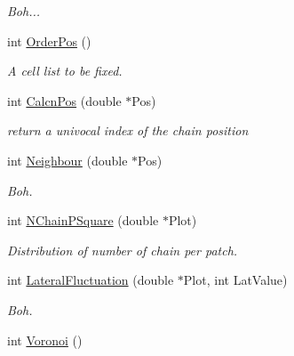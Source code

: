 \begin{DoxyCompactItemize}
\begin{DoxyCompactList}\small\item\em Boh... \end{DoxyCompactList}\item 
int \hyperlink{classVarData_a082d12c71897bca838b5eaad6deb3fae}{Order\+Pos} ()\hypertarget{classVarData_a082d12c71897bca838b5eaad6deb3fae}{}\label{classVarData_a082d12c71897bca838b5eaad6deb3fae}

\begin{DoxyCompactList}\small\item\em A cell list to be fixed. \end{DoxyCompactList}\item 
int \hyperlink{classVarData_a129e31bb544b71263ac43dda442b63c4}{Calcn\+Pos} (double $\ast$Pos)\hypertarget{classVarData_a129e31bb544b71263ac43dda442b63c4}{}\label{classVarData_a129e31bb544b71263ac43dda442b63c4}

\begin{DoxyCompactList}\small\item\em return a univocal index of the chain position \end{DoxyCompactList}\item 
int \hyperlink{classVarData_a933801832476dc21fcb11bf694c5d5d1}{Neighbour} (double $\ast$Pos)\hypertarget{classVarData_a933801832476dc21fcb11bf694c5d5d1}{}\label{classVarData_a933801832476dc21fcb11bf694c5d5d1}

\begin{DoxyCompactList}\small\item\em Boh. \end{DoxyCompactList}\item 
int \hyperlink{classVarData_a1d7407db719a858deae8f8b8b99bb0b7}{N\+Chain\+P\+Square} (double $\ast$Plot)\hypertarget{classVarData_a1d7407db719a858deae8f8b8b99bb0b7}{}\label{classVarData_a1d7407db719a858deae8f8b8b99bb0b7}

\begin{DoxyCompactList}\small\item\em Distribution of number of chain per patch. \end{DoxyCompactList}\item 
int \hyperlink{classVarData_a70ff47b5567c5401febca3a9ab77f9ab}{Lateral\+Fluctuation} (double $\ast$Plot, int Lat\+Value)\hypertarget{classVarData_a70ff47b5567c5401febca3a9ab77f9ab}{}\label{classVarData_a70ff47b5567c5401febca3a9ab77f9ab}

\begin{DoxyCompactList}\small\item\em Boh. \end{DoxyCompactList}\item 
int \hyperlink{classVarData_a74028c96f1da61fd4bb0b0df6c720bc0}{Voronoi} ()\hypertarget{classVarData_a74028c96f1da61fd4bb0b0df6c720bc0}{}\label{classVarData_a74028c96f1da61fd4bb0b0df6c720bc0}


\end{DoxyCompactItemize}
